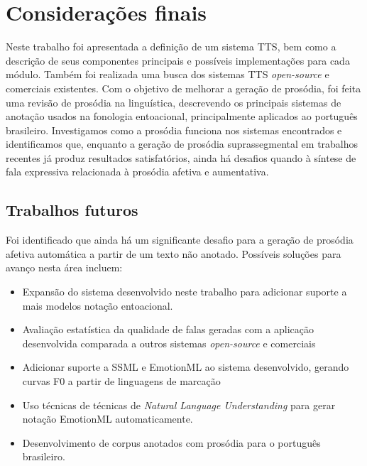 
\chapter{Considerações finais}
Neste trabalho foi apresentada a definição de um sistema TTS, bem como a descrição
de seus componentes principais e possíveis implementações para cada módulo.
Também foi realizada uma busca dos sistemas TTS \emph{open-source} e comerciais
existentes. Com o objetivo de melhorar a geração de prosódia, foi feita uma
revisão de prosódia na linguística, descrevendo os principais sistemas de
anotação usados na fonologia entoacional, principalmente aplicados ao português
brasileiro. Investigamos como a prosódia funciona nos sistemas encontrados e
identificamos que, enquanto a geração de prosódia suprassegmental em trabalhos
recentes já produz resultados satisfatórios, ainda há desafios quando à síntese
de fala expressiva relacionada à prosódia afetiva e aumentativa.

\section{Trabalhos futuros}
Foi identificado que ainda há um significante desafio para a geração de prosódia
afetiva automática a partir de um texto não anotado. Possíveis soluções para
avanço nesta área incluem:
\begin{itemize}
\item Expansão do sistema desenvolvido neste trabalho para adicionar suporte a
  mais modelos notação entoacional.
\item Avaliação estatística da qualidade de falas geradas com a aplicação desenvolvida comparada a outros sistemas \emph{open-source} e comerciais
\item Adicionar suporte a SSML e EmotionML ao sistema desenvolvido, gerando
  curvas F0 a partir de linguagens de marcação
\item Uso técnicas de técnicas de \emph{Natural Language Understanding} para gerar notação EmotionML automaticamente.
\item Desenvolvimento de corpus anotados com prosódia para o português brasileiro.
\end{itemize}

